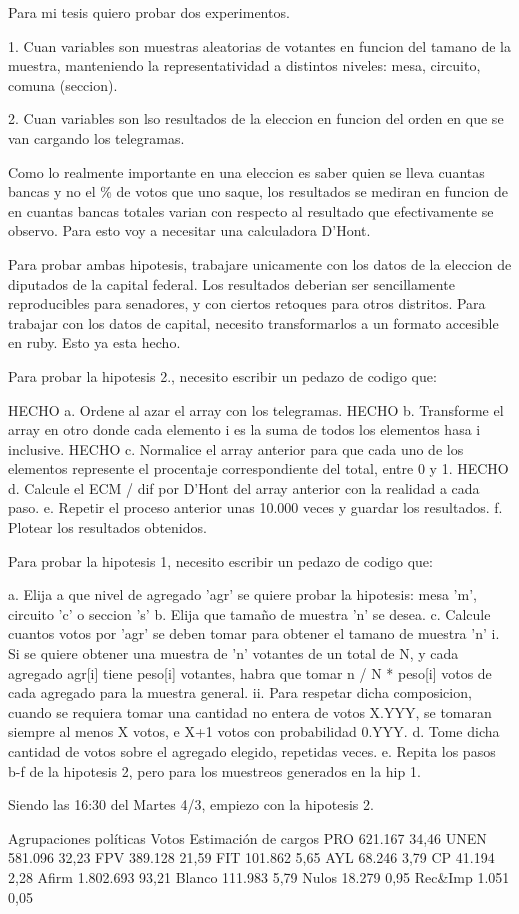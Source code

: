 Para mi tesis quiero probar dos experimentos.

1. Cuan variables son muestras aleatorias de votantes en funcion del tamano de la muestra, manteniendo la representatividad a distintos niveles: mesa, circuito, comuna (seccion).

2. Cuan variables son lso resultados de la eleccion en funcion del orden en que se van cargando los telegramas.

Como lo realmente importante en una eleccion es saber quien se lleva cuantas bancas y no el \% de votos que uno saque, los resultados se mediran en funcion de en cuantas bancas totales varian con respecto al resultado que efectivamente se observo. Para esto voy a necesitar una calculadora D'Hont.

Para probar ambas hipotesis, trabajare unicamente con los datos de la eleccion de diputados de la capital federal. Los resultados deberian ser sencillamente reproducibles para senadores, y con ciertos retoques para otros distritos. Para trabajar con los datos de capital, necesito transformarlos a un formato accesible en ruby. Esto ya esta hecho.

Para probar la hipotesis 2., necesito escribir un pedazo de codigo que:

HECHO	a. Ordene al azar el array con los telegramas.
HECHO	b. Transforme el array en otro donde cada elemento i es la suma de todos los elementos hasa i inclusive.
HECHO	c. Normalice el array anterior para que cada uno de los elementos represente el procentaje correspondiente del total, entre 0 y 1.
HECHO	d. Calcule el ECM / dif por D'Hont del array anterior con la realidad a cada paso.
	e. Repetir el proceso anterior unas 10.000 veces y guardar los resultados.
	f. Plotear los resultados obtenidos.

Para probar la hipotesis 1, necesito escribir un pedazo de codigo que:

	a. Elija a que nivel de agregado 'agr' se quiere probar la hipotesis: mesa 'm', circuito 'c' o seccion 's'
	b. Elija que tama\~no de muestra 'n' se desea.
	c. Calcule cuantos votos por 'agr' se deben tomar para obtener el tamano de muestra 'n'
		i. Si se quiere obtener una muestra de 'n' votantes de un total de N, y cada agregado agr[i] tiene peso[i] votantes, habra que tomar n / N * peso[i] votos de cada agregado para la muestra general.
		ii. Para respetar dicha composicion, cuando se requiera tomar una cantidad no entera de votos X.YYY, se tomaran siempre al menos X votos, e X+1 votos con probabilidad 0.YYY.
	d. Tome dicha cantidad de votos sobre el agregado elegido, repetidas veces.
	e. Repita los pasos b-f de la hipotesis 2, pero para los muestreos generados en la hip 1.

Siendo las 16:30 del Martes 4/3, empiezo con la hipotesis 2.




Agrupaciones políticas 	Votos 	Estimación de cargos
PRO 	621.167 	34,46%
UNEN 	581.096 	32,23%
FPV 	389.128 	21,59%
FIT 	101.862 	5,65%
AYL 	68.246 		3,79%
CP 	41.194 		2,28%
Afirm 	1.802.693 	93,21%
Blanco 	111.983 	5,79%
Nulos 	18.279 		0,95%
Rec&Imp	1.051 		0,05%
